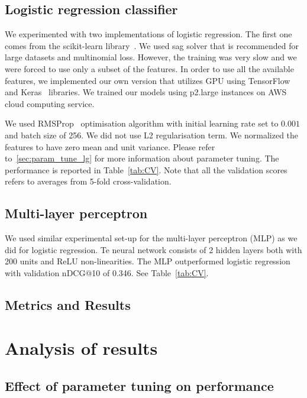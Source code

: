 \documentclass[english]{article}
\theoremstyle{definition}
\begin{document}
\begin{multicols}{2}
\subsection{Logistic regression classifier} \label{sec:lg}
We experimented with two implementations of logistic regression. The first one comes from the scikit-learn library~\cite{scikit-learn}. We used sag solver that is recommended for large datasets and multinomial loss. However, the training was very slow and we were forced to use only a subset of the features. In order to use all the available features, we implemented our own version that utilizes GPU using TensorFlow~\cite{tensorflow2015-whitepaper} and Keras~\cite{chollet2015keras} libraries. We trained our models using p2.large instances on AWS cloud computing service.

We used RMSProp~\cite{tieleman2000leccture} optimisation algorithm with initial learning rate set to $0.001$ and batch size of 256. We did not use L2 regularisation term. We normalized the features to have zero mean and unit variance. Please refer to~\ref{sec:param_tune_lg} for more information about parameter tuning. The performance is reported in Table~\ref{tab:CV}. Note that all the validation scores refers to averages from 5-fold cross-validation.

\subsection{Multi-layer perceptron}
We used similar experimental set-up for the multi-layer perceptron (MLP) as we did for logistic regression. Te neural network consists of 2 hidden layers both with 200 units and ReLU non-linearities. The MLP outperformed logistic regression with validation nDCG@10 of 0.346. See Table~\ref{tab:CV}.


\subsection{Metrics and Results}

\section{Analysis of results}

\subsection{Effect of parameter tuning on performance}


\end{multicols}
\end{document}
